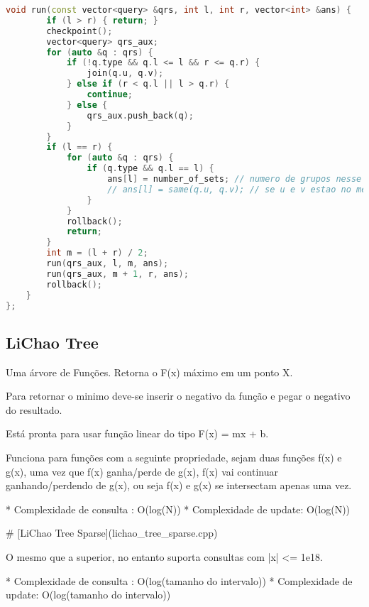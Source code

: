 \documentclass[11pt, a4paper, twoside]{article}
\begin{document}
\begin{lstlisting}[language=C++]
    void run(const vector<query> &qrs, int l, int r, vector<int> &ans) {
        if (l > r) { return; }
        checkpoint();
        vector<query> qrs_aux;
        for (auto &q : qrs) {
            if (!q.type && q.l <= l && r <= q.r) {
                join(q.u, q.v);
            } else if (r < q.l || l > q.r) {
                continue;
            } else {
                qrs_aux.push_back(q);
            }
        }
        if (l == r) {
            for (auto &q : qrs) {
                if (q.type && q.l == l) {
                    ans[l] = number_of_sets; // numero de grupos nesse tempo
                    // ans[l] = same(q.u, q.v); // se u e v estao no mesmo grupo
                }
            }
            rollback();
            return;
        }
        int m = (l + r) / 2;
        run(qrs_aux, l, m, ans);
        run(qrs_aux, m + 1, r, ans);
        rollback();
    }
};
\end{lstlisting}

\subsection{LiChao Tree}


Uma árvore de Funções. Retorna o F(x) máximo em um ponto X.

Para retornar o minimo deve-se inserir o negativo da função e pegar o negativo do resultado.

Está pronta para usar função linear do tipo F(x) = mx + b.

Funciona para funções com a seguinte propriedade, sejam duas funções f(x) e g(x), uma vez que f(x) ganha/perde de g(x), f(x) vai continuar ganhando/perdendo de g(x),
ou seja f(x) e g(x) se intersectam apenas uma vez.

* Complexidade de consulta : O(log(N))
* Complexidade de update: O(log(N))

\# [LiChao Tree Sparse](lichao\_tree\_sparse.cpp)

O mesmo que a superior, no entanto suporta consultas com |x| <= 1e18.

* Complexidade de consulta : O(log(tamanho do intervalo))
* Complexidade de update: O(log(tamanho do intervalo))
\end{document}
